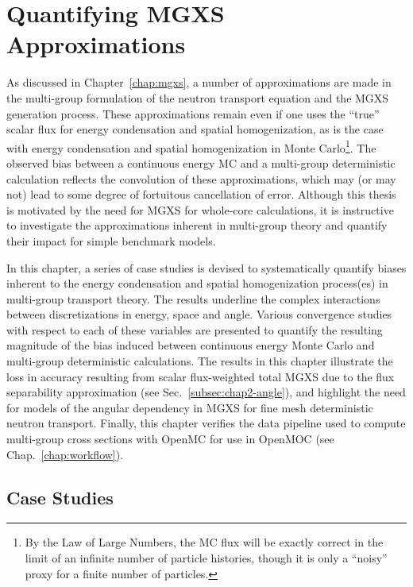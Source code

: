 \chapter{Quantifying MGXS Approximations}
\label{chap:biases}

As discussed in Chapter~\ref{chap:mgxs}, a number of approximations are made in the multi-group formulation of the neutron transport equation and the \ac{MGXS} generation process. These approximations remain even if one uses the ``true'' scalar flux for energy condensation and spatial homogenization, as is the case with energy condensation and spatial homogenization in Monte Carlo\footnote{By the Law of Large Numbers, the \ac{MC} flux will be exactly correct in the limit of an infinite number of particle histories, though it is only a ``noisy'' proxy for a finite number of particles.}. The observed bias between a continuous energy \ac{MC} and a multi-group deterministic calculation reflects the convolution of these approximations, which may (or may not) lead to some degree of fortuitous cancellation of error. Although this thesis is motivated by the need for \ac{MGXS} for whole-core calculations, it is instructive to investigate the approximations inherent in multi-group theory and quantify their impact for simple benchmark models.

In this chapter, a series of case studies is devised to systematically quantify biases inherent to the energy condensation and spatial homogenization process(es) in multi-group transport theory. The results underline the complex interactions between discretizations in energy, space and angle. Various convergence studies with respect to each of these variables are presented to quantify the resulting magnitude of the bias induced between continuous energy Monte Carlo and multi-group deterministic calculations. The results in this chapter illustrate the loss in accuracy resulting from scalar flux-weighted total \ac{MGXS} due to the flux separability approximation (see Sec.~\ref{subsec:chap2-angle}), and highlight the need for models of the angular dependency in \ac{MGXS} for fine mesh deterministic neutron transport. Finally, this chapter verifies the data pipeline used to compute multi-group cross sections with OpenMC for use in OpenMOC (see Chap.~\ref{chap:workflow}).


\section{Case Studies}
\label{sec:chap5-case-studies}

